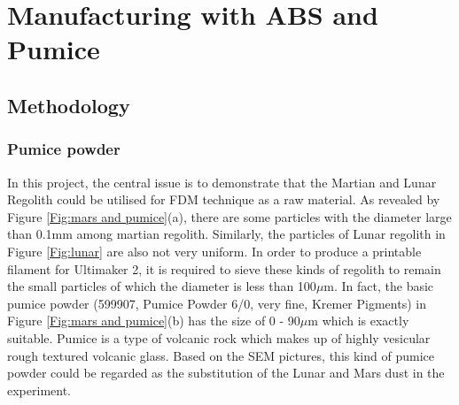\chapter{Manufacturing with ABS and Pumice}
\renewcommand{\baselinestretch}{\mystretch}
\label{chap:Pumice}

\section{Methodology}
\subsection{Pumice powder}
In this project, the central issue is to demonstrate that the Martian and Lunar Regolith could be utilised for FDM technique as a raw material. As revealed by Figure \ref{Fig:mars and pumice}(a), there are some particles with the diameter large than 0.1mm among martian regolith. Similarly, the particles of Lunar regolith in Figure \ref{Fig:lunar} are also not very uniform. In order to produce a printable filament for Ultimaker 2, it is required to sieve these kinds of regolith to remain the small particles of which the diameter is less than 100$\mu$m. In fact, the basic pumice powder (599907, Pumice Powder 6/0, very fine, Kremer Pigments) in  Figure \ref{Fig:mars and pumice}(b) has the size of 0 - 90$\mu$m which is exactly suitable. Pumice is a type of volcanic rock which makes up of highly vesicular rough textured volcanic glass. Based on the SEM pictures, this kind of pumice powder could be regarded as the substitution of the Lunar and Mars dust in the experiment.  
